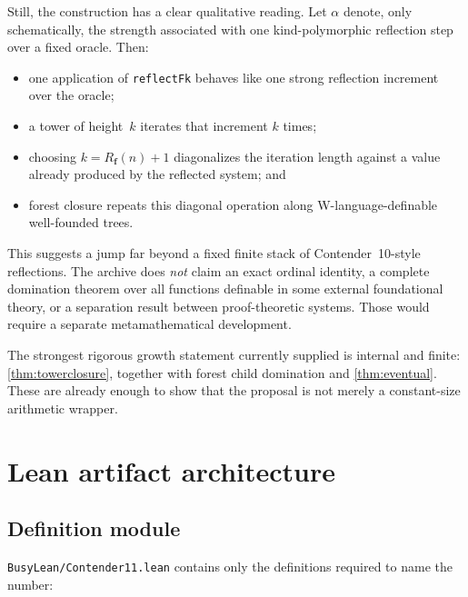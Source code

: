 \documentclass[11pt]{article}
\theoremstyle{definition}
\theoremstyle{remark}
\newcommand{\Rfam}{\ensuremath{R_{\mathbf f}}}
\newcommand{\code}[1]{\texttt{#1}}
\begin{document}
Still, the construction has a clear qualitative reading. Let $\alpha$ denote,
only schematically, the strength associated with one kind-polymorphic
reflection step over a fixed oracle. Then:

\begin{itemize}[leftmargin=*]
\item one application of \code{reflectFk} behaves like one strong reflection
  increment over the oracle;
\item a tower of height~$k$ iterates that increment $k$ times;
\item choosing $k=\Rfam(n)+1$ diagonalizes the iteration length against a
  value already produced by the reflected system; and
\item forest closure repeats this diagonal operation along W-language-definable
  well-founded trees.
\end{itemize}

This suggests a jump far beyond a fixed finite stack of Contender~10-style
reflections. The archive does \emph{not} claim an exact ordinal identity, a
complete domination theorem over all functions definable in some external
foundational theory, or a separation result between proof-theoretic systems.
Those would require a separate metamathematical development.

The strongest rigorous growth statement currently supplied is internal and
finite: \cref{thm:towerclosure}, together with forest child domination and
\cref{thm:eventual}. These are already enough to show that the proposal is not
merely a constant-size arithmetic wrapper.

\section{Lean artifact architecture}

\subsection{Definition module}

\code{BusyLean/Contender11.lean} contains only the definitions required to name
the number:
\end{document}
